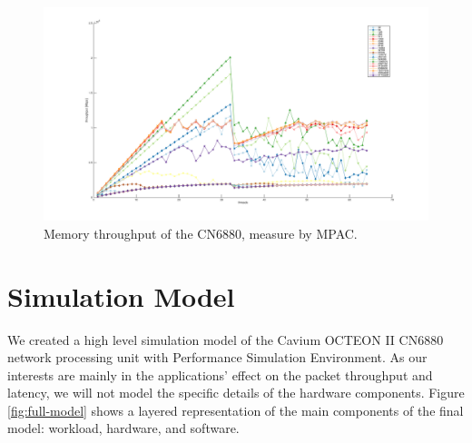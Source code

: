 
\begin{figure}[]
  \begin{center}
    \includegraphics[width=\textwidth]{images/mem-throughput.pdf}
    \caption{Memory throughput of the CN6880, measure by MPAC.}
    \label{fig:mem-throughput}
  \end{center}
\end{figure}


\section{Simulation Model}
\label{sec:simulation-model}

We created a high level simulation model of the Cavium OCTEON II CN6880 network processing unit with Performance Simulation Environment. As our interests are mainly in the applications' effect on the packet throughput and latency, we will not model the specific details of the hardware components. Figure \ref{fig:full-model} shows a layered representation of the main components of the final model: workload, hardware, and software.

